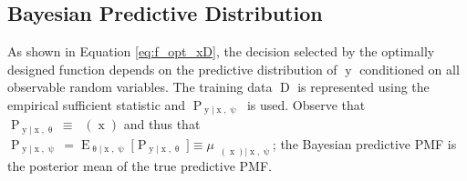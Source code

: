 \documentclass{article}
\DeclareMathOperator{\xrm}{\mathrm{x}}
\DeclareMathOperator{\yrm}{\mathrm{y}}
\DeclareMathOperator{\Drm}{\mathrm{D}}
\DeclareMathOperator{\Prm}{\mathrm{P}}
\DeclareMathOperator{\Erm}{\mathrm{E}}
\DeclareMathOperator{\upthetac}{\uptheta_\text{c}}
\begin{document}
\subsection{Bayesian Predictive Distribution}

As shown in Equation \eqref{eq:f_opt_xD}, the decision selected by the optimally designed function depends on the predictive distribution of $\yrm$ conditioned on all observable random variables. The training data $\Drm$ is represented using the empirical sufficient statistic and $\Prm_{\yrm | \xrm,\uppsi}$ is used. Observe that $\Prm_{\yrm | \xrm,\uptheta} \equiv \upthetac(\xrm)$ and thus that $\Prm_{\yrm | \xrm,\uppsi} = \Erm_{\uptheta | \xrm,\uppsi}\big[ \Prm_{\yrm | \xrm,\uptheta} \big] \equiv \mu_{\upthetac(\xrm) | \xrm,\uppsi}$; the Bayesian predictive PMF is the posterior mean \cite{murphy} of the true predictive PMF.
\end{document}
